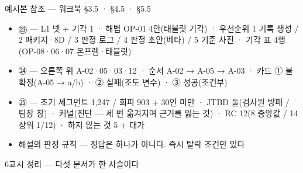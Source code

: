 \begin{frame}{예시본 참조 — 워크북 §3.5 · §4.5 · §5.5}
\begin{itemize}
\item ㉓ — L1 넷 + 기각 1 · 해법 OP-01 4안(태블릿 기각) · 우선순위 1 기록 생성 / 2 패키지·8D / 3 판정 로그 / 4 판정 초안(베타) / 5 기준 사진 · 기각 표 4행(OP-08·06·07 온프렘·태블릿)
\item ㉔ — 오른쪽 위 A-02·05·03·12 · 순서 A-02 → A-05 → A-03 · 카드 ① 불확정(A-05 → a/b) · ② 실패(조도 변수) · ③ 성공(조건부)
\item ㉕ — 초기 세그먼트 1,247 / 회피 903 + 30인 미만 · JTBD 둘(검사원 방패 / 팀장 창) · 커널(진단 — 세 번 옮겨지며 근거를 잃는 것) · RC 12(8 중앙값 / 14 상위 1/12) · 하지 않는 것 5 + 대가
\item 해설의 판정 규칙 — 정답은 하나가 아니다. 즉시 탈락 조건만 있다
\end{itemize}
\end{frame}

\begin{frame}{6교시 정리 — 다섯 문서가 한 사슬이다}
\end{frame}

